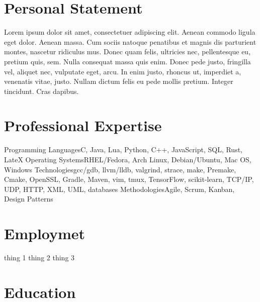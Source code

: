 \documentclass[11pt,a4paper]{my_cv}
\begin{document}
\begin{cvheader}
\end{cvheader}

\section{Personal Statement}
Lorem ipsum dolor sit amet, consectetuer adipiscing elit. 
Aenean commodo ligula eget dolor.
Aenean massa.
Cum sociis natoque penatibus et magnis dis parturient montes, nascetur ridiculus mus.
Donec quam felis, ultricies nec, pellentesque eu, pretium quis, sem.
Nulla consequat massa quis enim.
Donec pede justo, fringilla vel, aliquet nec, vulputate eget, arcu.
In enim justo, rhoncus ut, imperdiet a, venenatis vitae, justo.
Nullam dictum felis eu pede mollis pretium.
Integer tincidunt.
Cras dapibus.

\section{Professional Expertise}
\expertise
{Programming Languages}{C, Java, Lua, Python, C++, JavaScript, SQL, Rust, LateX}
{Operating Systems}{RHEL/Fedora, Arch Linux, Debian/Ubuntu, Mac OS, Windows}
{Technologies}{gcc/gdb, llvm/lldb, valgrind, strace, make, Premake, Cmake, OpenSSL, Gradle, Maven, vim, tmux, TensorFlow, scikit-learn, TCP/IP, UDP, HTTP, XML, UML, databases}
{Methodologies}{Agile, Scrum, Kanban, Design Patterns}

\section{Employmet}
\workitems
{thing 1}
{thing 2}
{thing 3}


\section{Education}


\end{document}

